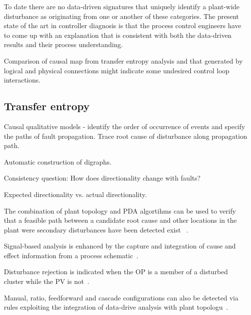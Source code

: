 To date there are no data-driven signatures that uniquely identify a plant-wide disturbance as originating from one or another of these categories.
The present state of the art in controller diagnosis is that the process control engineers have to come up with an explanation that is consistent with both the data-driven results and their process understanding.


Comparison of causal map from transfer entropy analysis and that generated by logical and physical connections might indicate some undesired control loop interactions.


\subsection{Transfer entropy}


Causal qualitative models - identify the order of occurrence of events and specify the paths of fault propagation.
Trace root cause of disturbance along propagation path.

Automatic construction of digraphs.

Consistency question:
How does directionality change with faults?

Expected directionality vs. actual directionality.

The combination of plant topology and PDA algortihms can be used to verify that a feasible path between a candidate root cause and other locations in the plant were secondary disturbances have been detected exist ~\cite{Yim2006}.

Signal-based analysis is enhanced by the capture and integration of cause and effect information from a process schematic~\cite{Yim2006}.

Disturbance rejection is indicated when the OP is a member of a disturbed cluster while the PV is not~\cite{Yim2006}.

Manual, ratio, feedforward and cascade configurations can also be detected via rules exploiting the integration of data-drive analysis with plant topologu~\cite{Yim2006}.

